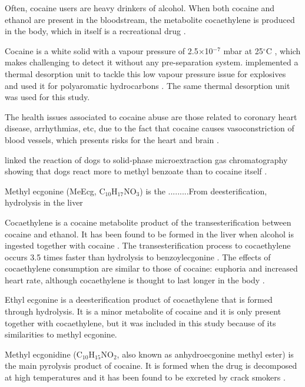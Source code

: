 Often, cocaine users are heavy drinkers of alcohol. When both cocaine and ethanol are present in the bloodstream, the metabolite cocaethylene is produced in the body, which in itself is a recreational drug \cite{mccance1993concurrent}. 



Cocaine is a white solid with a vapour pressure of 2.5$\times$10$^{-7}$ mbar  at 25$^\circ$C \cite{cocaineVP55}, which makes challenging to detect it without any pre-separation system. \citeauthor{RN445} implemented a thermal desorption unit to tackle this low vapour pressure issue for explosives and \citeauthor{blenkhorn2019novel} used it for polyaromatic hydrocarbons \cite{RN445,blenkhorn2019novel}.
The same thermal desorption unit was used for this study.

The health issues associated to cocaine abuse are those related to coronary heart disease, arrhythmias, etc, due to the fact that cocaine causes vasoconstriction of blood vessels, which presents risks for the heart and brain \cite{cregler1986medical}.

\citeauthor{furton2002identification} linked the reaction of dogs to solid-phase microextraction gas chromatography  showing that dogs react more to methyl benzoate  than to cocaine itself \cite{furton2002identification}.

Methyl ecgonine (MeEcg, C$_{10}$H$_{17}$NO$_3$) is the .........From deesterification, hydrolysis in the liver

Cocaethylene is a cocaine metabolite product of the transesterification between cocaine and ethanol. It has been found to be formed in the liver when alcohol is ingested together with cocaine  \cite{jatlow1991cocaethylene}.
%
The transesterification process to cocaethylene occurs 3.5 times faster than hydrolysis to benzoylecgonine  \cite{snozek2012cocaine}.
%
The effects of cocaethylene consumption are similar to those of cocaine: euphoria and increased heart rate, although cocaethylene is thought to last longer in the body \cite{mccance1995cocaethylene}.

Ethyl ecgonine is a deesterification product of cocaethylene that is formed through hydrolysis.
%
It is a minor metabolite of cocaine and it is only present together with cocaethylene, but it was included in this study because of its similarities to methyl ecgonine.




Methyl ecgonidine (C$_{10}$H$_{15}$NO$_2$, also known as anhydroecgonine methyl ester) is the main pyrolysis product of cocaine. It is formed when the drug is decomposed at high temperatures and it has been found to be excreted by crack smokers \cite{anhydroecgoninemethylester}.



